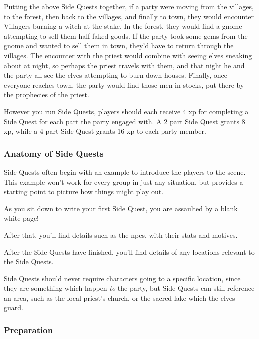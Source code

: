 \begin{multicols}{2}
Putting the above Side Quests together, if a party were moving from the villages, to the forest, then back to the villages, and finally to town, they would 
encounter Villagers burning a witch at the stake.
In the forest, they would find a gnome attempting to sell them half-faked goods.
If the party took some gems from the gnome and wanted to sell them in town, they'd have to return through the villages.
The encounter with the priest would combine with seeing elves sneaking about at night, so perhaps the priest travels with them, and that night he and the party all see the elves attempting to burn down houses.
Finally, once everyone reaches town, the party would find those men in stocks, put there by the prophecies of the priest.

However you run Side Quests, players should each receive 4 \gls{xp} for completing a Side Quest for each part the party engaged with.
A 2 part Side Quest grants 8 \gls{xp}, while a 4 part Side Quest grants 16 \gls{xp} to each party member.

\subsubsection{Anatomy of Side Quests}

Side Quests often begin with an example to introduce the players to the scene.
This example won't work for every group in just any situation, but provides a starting point to picture how things might play out.

\begin{boxtext}

	As you sit down to write your first Side Quest, you are assaulted by a blank white page!

\end{boxtext}

After that, you'll find details such as the \glspl{npc}, with their stats and motives.

After the Side Quests have finished, you'll find details of any locations relevant to the Side Quests.

Side Quests should never require characters going to a specific location, since they are something which happen \emph{to} the party, but Side Quests can still reference an area, such as the local priest's church, or the sacred lake which the elves guard.

\subsubsection{Preparation}


\end{multicols}
